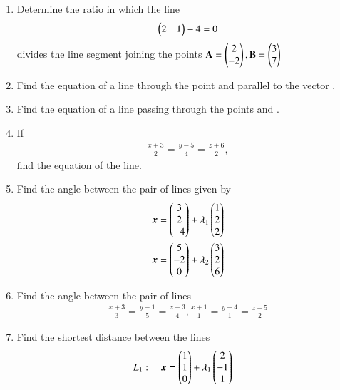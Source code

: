 \renewcommand{\theequation}{\theenumi}
\begin{enumerate}[label=\arabic*.,ref=\thesubsection.\theenumi]
\item Determine the ratio in which the line 
\begin{align}
\begin{pmatrix}2 & 1\end{pmatrix} - 4 = 0
\end{align}
%
divides the line segment joining the points $\mathbf{A}=\begin{pmatrix}2\\-2\end{pmatrix}, \mathbf{B}=\begin{pmatrix}3\\7\end{pmatrix}$
\item Find the equation of a line through the point  and parallel to the vector .
\item Find the equation of a line passing through the points  and .
\item If
\begin{align}
\frac{x+3}{2} = \frac{y-5}{4} = \frac{z+6}{2}, 
\end{align}
%
find the equation of the line.
\item Find the angle between the pair of lines given by 
\begin{align}
\bm{x} &= \begin{pmatrix}3\\2\\-4\end{pmatrix} + \lambda_1\begin{pmatrix}1 \\ 2 \\2\end{pmatrix}
\\
\bm{x} &= \begin{pmatrix}5\\-2\\0\end{pmatrix} + \lambda_2\begin{pmatrix}3 \\ 2 \\6\end{pmatrix}
\end{align}
\item Find the angle between the pair of lines
\begin{align}
\frac{x+3}{3} = \frac{y-1}{5} = \frac{z+3}{4}, 
\frac{x+1}{1} = \frac{y-4}{1} = \frac{z-5}{2} 
\end{align}
\item Find the shortest distance between the lines 
\begin{align}
L_1: \quad \bm{x} &= \myvec{1\\1\\0} + \lambda_1\myvec{2 \\ -1 \\1}

\end{align}
\end{enumerate}
